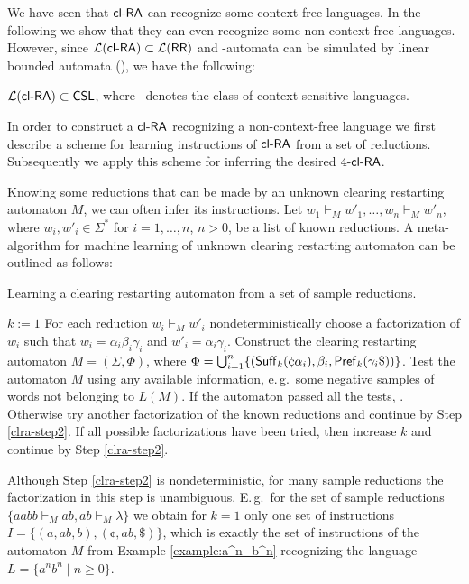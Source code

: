 We have seen that $\clRA$ can recognize some context-free languages. In the following we show that they can even recognize some non-context-free languages. However, since $\calL{\clRA} \subset \calL{\RR}$ and \RR-automata can be simulated by linear bounded automata (\cite{JMPV99}), we have the following:

\begin{corollary}
$\calL{\clRA} \subset \CSL$, where \CSL\ denotes the class of context-sensitive languages.
\end{corollary}

In order to construct a $\clRA$ recognizing a non-context-free language we first describe a scheme for learning instructions of $\clRA$ from a set of reductions. Subsequently we apply this scheme for inferring the desired $\kclRA[4]$.

Knowing some reductions that can be made by an unknown clearing restarting automaton $M$, we can often infer its instructions. Let $w_1 \vdash_M w'_1, \dots, w_n \vdash_M w'_n$, where $w_i,w'_i \in \Sigma^*$ for $i=1, \dots, n$, $n>0$, be a list of known reductions. A meta-algorithm for machine learning of unknown clearing restarting automaton can be outlined as follows:

\begin{algorithm}
\caption{Learning a clearing restarting automaton from a set of sample reductions.}
\label{algorithm:clra-learning}
\DontPrintSemicolon
\LinesNumbered
{}
$k := 1$\;
For each reduction $w_i \vdash_M w'_i$ nondeterministically choose a factorization of $w_i$ such that $w_i = \alpha_i \beta_i \gamma_i$ and $w'_i = \alpha_i \gamma_i$.\;\label{clra-step2}
Construct the clearing restarting automaton $M = (\Sigma, \Phi)$, where $\Phi = \bigcup_{i=1}^n \{(\Suff_k(\cent\alpha_i),\beta_i,\Pref_k(\gamma_i\$))\}$.\;
Test the automaton $M$ using any available information, e.\,g.\ some negative samples of words not belonging to $L(M)$.\;
If the automaton passed all the tests, . \;
Otherwise try another factorization of the known reductions and continue by Step \ref{clra-step2}. If all possible factorizations have been tried, then increase $k$ and continue by Step \ref{clra-step2}.\;
\end{algorithm}

Although Step \ref{clra-step2} is nondeterministic, for many sample reductions the factorization in this step is unambiguous. E.\,g.\ for the set of sample reductions $\{aabb \vdash_M ab, ab \vdash_M \lambda\}$ we obtain for $k=1$ only one set of instructions $I=\{(a,ab,b),(\cent,ab,\$)\}$, which is exactly the set of instructions of the automaton $M$ from Example \ref{example:a^n_b^n} recognizing the language $L = \{a^nb^n \mid n\ge 0\}$.

